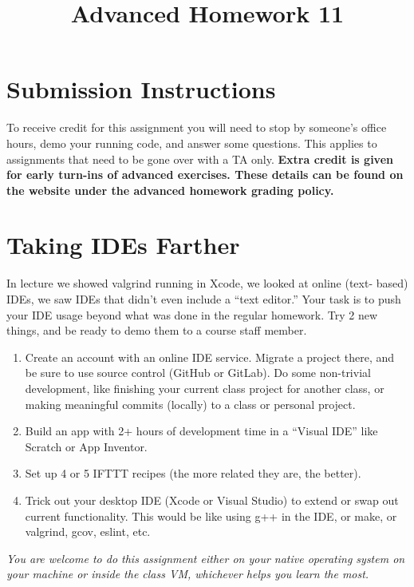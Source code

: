 \documentclass{article}
\begin{document}
\fancyfoot[C]{\color{gray} \thepage~/~\pageref*{LastPage}}
\pagestyle{fancyplain}

\title{\textbf{Advanced Homework 11\\}}
\author{\textbf{\color{red}{Due: Wednesday, November 29th, 11:59PM (Hard Deadline)}}}
\date{}
\maketitle


\section*{Submission Instructions}
To receive credit for this assignment you will need to stop by someone's
office hours, demo your running code, and answer some questions. \textbf{\color{red}{Make sure
to check the office hour schedule as the real due date is at the last office
hours before the date listed above.}} This applies to assignments that need to be gone over with a TA only.
\textbf{Extra credit is given for early turn-ins of advanced exercises. These details can be found on the website under the advanced homework grading policy.}


\section*{Taking IDEs Farther}
In lecture we showed valgrind running in Xcode, we looked at online (text-
based) IDEs, we saw IDEs that didn't even include a ``text editor.'' Your task
is to push your IDE usage beyond what was done in the regular homework. Try
2 new things, and be ready to demo them to a course staff member.

\begin{enumerate}
\item Create an account with an online IDE service. Migrate a project there,
      and be sure to use source control (GitHub or GitLab). Do some non-trivial
      development, like finishing your current class project for another class,
      or making meaningful commits (locally) to a class or personal project.
\item Build an app with 2+ hours of development time in a ``Visual IDE'' like
      Scratch or App Inventor.
\item Set up 4 or 5 IFTTT recipes (the more related they are, the better).
\item Trick out your desktop IDE (Xcode or Visual Studio) to extend or swap out
      current functionality. This would be like using g++ in the IDE, or make,
      or valgrind, gcov, eslint, etc.
\end{enumerate}

\emph{You are welcome to do this assignment either on your native operating
  system on your machine or inside the class VM, whichever helps you learn the
  most.}
\end{document}
